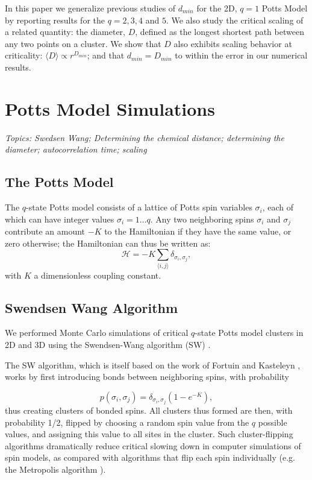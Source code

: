 \documentclass[pre,preprint]{revtex4-1}
\newcommand{\lb}{{\langle}}
\newcommand{\rb}{{\rangle}}
\begin{document}
In this paper we generalize previous studies of $d_{min}$ for the 2D, $q=1$ Potts Model by reporting results for the $q = 2, 3, 4$ and $5$.  We also study the critical scaling of a related quantity: the diameter, $D$, defined as the longest shortest path between any two points on a cluster.
We show that $D$ also exhibits scaling behavior at criticality: $\langle D \rangle \propto r^{D_{min}}$; and that $d_{min} = D_{min}$ to within the error in our numerical results. 

\section{Potts Model Simulations}
{\it Topics: Swedsen Wang; Determining the chemical distance; determining the diameter; autocorrelation time; scaling}

\subsection{The Potts Model} %

The $q$-state Potts model consists of a lattice of Potts spin variables $\sigma_i$, each of which can have integer values $\sigma_i = 1 \dots q$.  Any two neighboring spins $\sigma_i$ and $\sigma_j$ contribute an amount $-K$ to the Hamiltonian if they have the same value, or zero otherwise; the Hamiltonian can thus be written as:
\begin{equation}
\mathcal{H} = -K \sum_{\lb i,j \rb} \delta_{\sigma_i, \sigma_j},
\end{equation}    
with $K$ a dimensionless coupling constant.


\subsection{Swendsen Wang Algorithm} %

We performed Monte Carlo simulations of critical $q$-state Potts model clusters in 2D and 3D using the Swendsen-Wang algorithm (SW) \cite{SwWa86, NeBa99}.  

The SW algorithm, which is itself based on the work of Fortuin and Kasteleyn \cite{FoKa}, works by first introducing bonds between neighboring spins, with probability 

\begin{equation}
p(\sigma_i,\sigma_j) = \delta_{\sigma_i, \sigma_j} (1-e^{-K}),
\end{equation}  
thus creating clusters of bonded spins.   All clusters thus formed are then, with probability 1/2, flipped by choosing a random spin value from the $q$ possible values, and assigning this value to all sites in the cluster.  Such cluster-flipping algorithms dramatically reduce critical slowing down in computer simulations of spin models, as compared with algorithms that flip each spin individually \cite{NeBa99} (e.g. the Metropolis algorithm \cite{Met}). 
\end{document}
